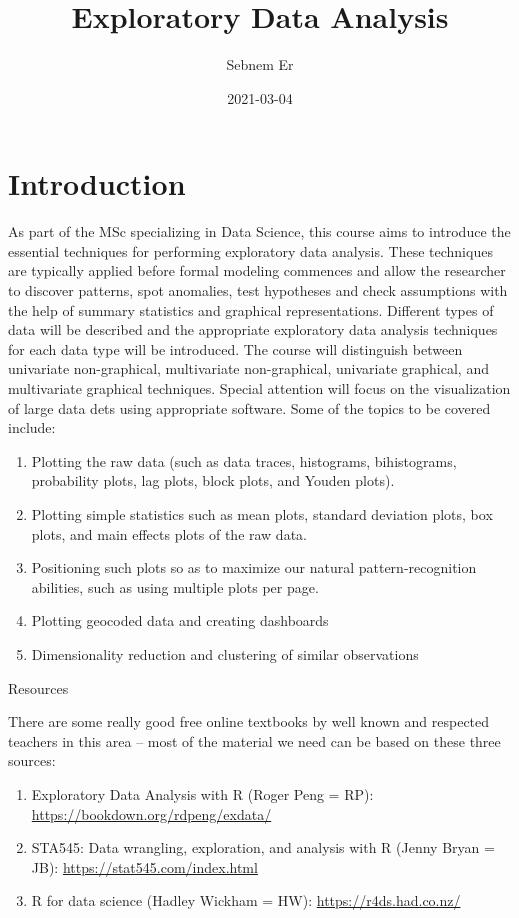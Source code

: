 \documentclass[
]{book}
\title{Exploratory Data Analysis}
\author{Sebnem Er}
\date{2021-03-04}
\providecommand{\tightlist}{%
  \setlength{\itemsep}{0pt}\setlength{\parskip}{0pt}}
\begin{document}
\maketitle

{
\setcounter{tocdepth}{1}
\tableofcontents
}
\hypertarget{introduction}{%
\chapter{Introduction}\label{introduction}}

As part of the MSc specializing in Data Science, this course aims to introduce the essential techniques for performing exploratory data analysis. These techniques are typically applied before formal modeling commences and allow the researcher to discover patterns, spot anomalies, test hypotheses and check assumptions with the help of summary statistics and graphical representations. Different types of data will be described and the appropriate exploratory data analysis techniques for each data type will be introduced. The course will distinguish between univariate non-graphical, multivariate non-graphical, univariate graphical, and multivariate graphical techniques. Special attention will focus on the visualization of large data dets using appropriate software. Some of the topics to be covered include:

\begin{enumerate}
\def\labelenumi{\arabic{enumi})}
\tightlist
\item
  Plotting the raw data (such as data traces, histograms, bihistograms, probability plots, lag plots, block plots, and Youden plots).
\item
  Plotting simple statistics such as mean plots, standard deviation plots, box plots, and main effects plots of the raw data.
\item
  Positioning such plots so as to maximize our natural pattern-recognition abilities, such as using multiple plots per page.
\item
  Plotting geocoded data and creating dashboards
\item
  Dimensionality reduction and clustering of similar observations
\end{enumerate}

Resources

There are some really good free online textbooks by well known and respected teachers in this area -- most of the material we need can be based on these three sources:

\begin{enumerate}
\def\labelenumi{\arabic{enumi}.}
\item
  Exploratory Data Analysis with R (Roger Peng = RP): \url{https://bookdown.org/rdpeng/exdata/}
\item
  STA545: Data wrangling, exploration, and analysis with R (Jenny Bryan = JB): \url{https://stat545.com/index.html}
\item
  R for data science (Hadley Wickham = HW): \url{https://r4ds.had.co.nz/}
\end{enumerate}
\end{document}

